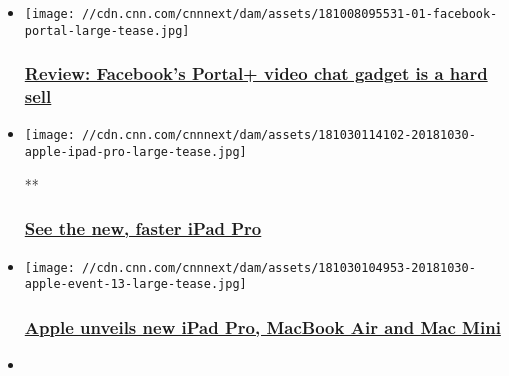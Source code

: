 \begin{itemize}
\item
  \href{/2018/11/08/tech/facebook-portal-review/index.html}{}

  \texttt{[image: //cdn.cnn.com/cnnnext/dam/assets/181008095531-01-facebook-portal-large-tease.jpg]}

  \hypertarget{review-facebooks-portal-video-chat-gadget-is-a-hard-sell-}{%
  \subsubsection{\texorpdfstring{\href{/2018/11/08/tech/facebook-portal-review/index.html}{Review:
  Facebook's Portal+ video chat gadget is a hard sell
  }}{Review: Facebook's Portal+ video chat gadget is a hard sell }}\label{review-facebooks-portal-video-chat-gadget-is-a-hard-sell-}}
\item
  \href{/videos/business/2018/10/30/ipad-unveil-oct-2018.cnn-business}{}

  \texttt{[image: //cdn.cnn.com/cnnnext/dam/assets/181030114102-20181030-apple-ipad-pro-large-tease.jpg]}

  **

  \hypertarget{see-the-new-faster-ipad-pro}{%
  \subsubsection{\texorpdfstring{\href{/videos/business/2018/10/30/ipad-unveil-oct-2018.cnn-business}{See
  the new, faster iPad
  Pro}}{See the new, faster iPad Pro}}\label{see-the-new-faster-ipad-pro}}
\item
  \href{/2018/10/30/tech/apple-event-october-2018/index.html}{}

  \texttt{[image: //cdn.cnn.com/cnnnext/dam/assets/181030104953-20181030-apple-event-13-large-tease.jpg]}

  \hypertarget{apple-unveils-new-ipad-pro-macbook-air-and-mac-mini}{%
  \subsubsection{\texorpdfstring{\href{/2018/10/30/tech/apple-event-october-2018/index.html}{Apple
  unveils new iPad Pro, MacBook Air and Mac
  Mini}}{Apple unveils new iPad Pro, MacBook Air and Mac Mini}}\label{apple-unveils-new-ipad-pro-macbook-air-and-mac-mini}}
\item
  \href{/videos/business/2018/10/30/apple-event-new-products-brooklyn.cnn-business}{}


\end{itemize}
